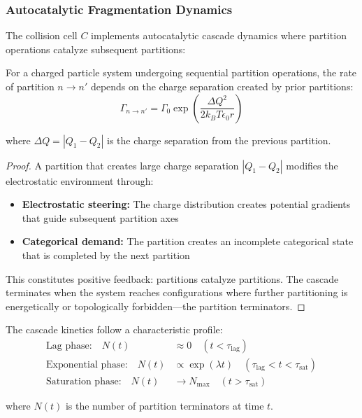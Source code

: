 \subsubsection{Autocatalytic Fragmentation Dynamics}

The collision cell $C$ implements autocatalytic cascade dynamics where partition operations catalyze subsequent partitions:

\begin{theorem}
\label{thm:autocatalytic_cascade}
For a charged particle system undergoing sequential partition operations, the rate of partition $n \to n'$ depends on the charge separation created by prior partitions:
\begin{equation}
\Gamma_{n \to n'} = \Gamma_0 \exp\left(\frac{\Delta Q^2}{2k_B T \epsilon_0 r}\right)
\end{equation}

where $\Delta Q = |Q_1 - Q_2|$ is the charge separation from the previous partition.
\end{theorem}

\begin{proof}
A partition that creates large charge separation $|Q_1 - Q_2|$ modifies the electrostatic environment through:
\begin{itemize}
    \item \textbf{Electrostatic steering:} The charge distribution creates potential gradients that guide subsequent partition axes
    \item \textbf{Categorical demand:} The partition creates an incomplete categorical state that is completed by the next partition
\end{itemize}

This constitutes positive feedback: partitions catalyze partitions. The cascade terminates when the system reaches configurations where further partitioning is energetically or topologically forbidden—the partition terminators.
\end{proof}

\begin{corollary}
\label{cor:lag_exp_sat}
The cascade kinetics follow a characteristic profile:
\begin{align}
\text{Lag phase:} \quad N(t) &\approx 0 \quad (t < \tau_{\text{lag}}) \\
\text{Exponential phase:} \quad N(t) &\propto \exp(\lambda t) \quad (\tau_{\text{lag}} < t < \tau_{\text{sat}}) \\
\text{Saturation phase:} \quad N(t) &\to N_{\max} \quad (t > \tau_{\text{sat}})
\end{align}

where $N(t)$ is the number of partition terminators at time $t$.
\end{corollary}

